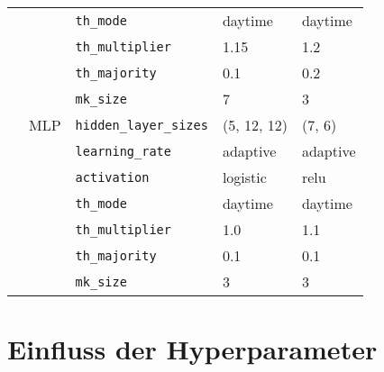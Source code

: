 \begin{table}[h!]
\begin{tabular}{lllll}
                        &           & \texttt{th\_mode}             & daytime     & daytime     \\
                        &           & \texttt{th\_multiplier}       & 1.15        & 1.2         \\
                        &           & \texttt{th\_majority}         & 0.1         & 0.2         \\
                        &           & \texttt{mk\_size}             & 7           & 3           \\
                        & MLP       & \texttt{hidden\_layer\_sizes} & (5, 12, 12) & (7, 6)      \\
                        &           & \texttt{learning\_rate}       & adaptive    & adaptive    \\
                        &           & \texttt{activation}           & logistic    & relu        \\
                        &           & \texttt{th\_mode}             & daytime     & daytime     \\
                        &           & \texttt{th\_multiplier}       & 1.0         & 1.1         \\
                        &           & \texttt{th\_majority}         & 0.1         & 0.1         \\
                        &           & \texttt{mk\_size}             & 3           & 3            \\
    \end{tabular}
\end{table}

\newpage
\phantom{phantom}
\newpage

\section{Einfluss der Hyperparameter \label{appendix-ranking}}

